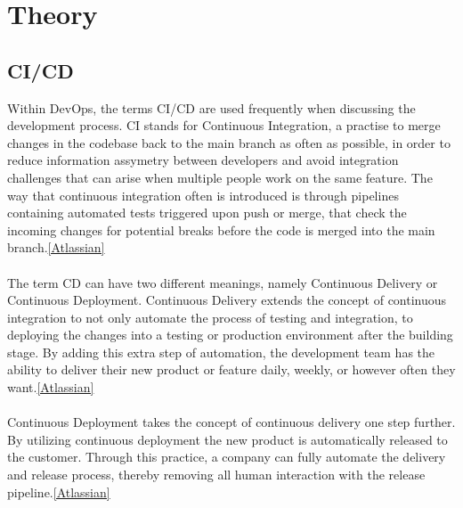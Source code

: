 \section{Theory}
  \subsection{CI/CD}
    Within DevOps, the terms CI/CD are used frequently when discussing the development process. CI stands for Continuous Integration, a practise to merge changes in the codebase back to the main branch as often as possible, in order to reduce information assymetry between developers and avoid integration challenges that can arise when multiple people work on the same feature. The way that continuous integration often is introduced is through pipelines containing automated tests triggered upon push or merge, that check the incoming changes for potential breaks before the code is merged into the main branch.\ref{Atlassian}

  \paragraph{}
    The term CD can have two different meanings, namely Continuous Delivery or Continuous Deployment. Continuous Delivery extends the concept of continuous integration to not only automate the process of testing and integration, to deploying the changes into a testing or production environment after the building stage. By adding this extra step of automation, the development team has the ability to deliver their new product or feature daily, weekly, or however often they want.\ref*{Atlassian}
  
  \paragraph{}
    Continuous Deployment takes the concept of continuous delivery one step further. By utilizing continuous deployment the new product is automatically released to the customer. Through this practice, a company can fully automate the delivery and release process, thereby removing all human interaction with the release pipeline.\ref*{Atlassian}
